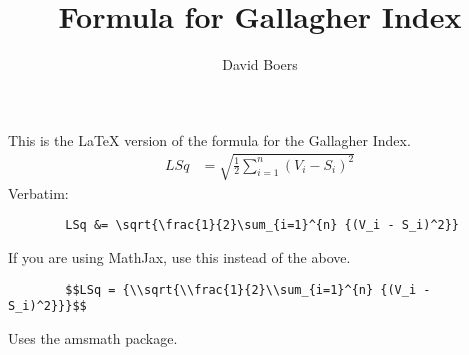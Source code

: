 \documentclass{article}
\title{Formula for Gallagher Index}
\author{David Boers}
\begin{document}
    \maketitle
    This is the \LaTeX{} version of the formula for the Gallagher Index.
    \begin{align}
        LSq &= \sqrt{\frac{1}{2}\sum_{i=1}^{n} {(V_i - S_i)^2}}
    \end{align}
    Verbatim:
    \begin{verbatim}
        LSq &= \sqrt{\frac{1}{2}\sum_{i=1}^{n} {(V_i - S_i)^2}}
    \end{verbatim}
    If you are using MathJax, use this instead of the above.
    \begin{verbatim}
        $$LSq = {\\sqrt{\\frac{1}{2}\\sum_{i=1}^{n} {(V_i - S_i)^2}}}$$
    \end{verbatim}
    Uses the amsmath package.
\end{document}
